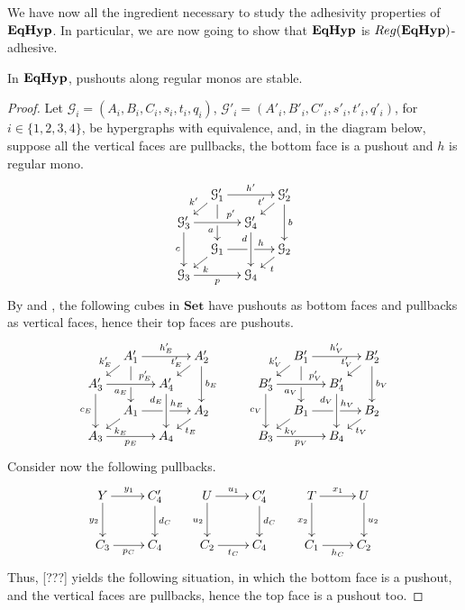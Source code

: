 \documentclass[a4paper,UKenglish,cleveref,pdftex,thm-restate,numberwithinsect]{lipics-v2021}
\newcommand{\Set}{\mathbf{Set}}
\def\B{\textbf {\textup{B}}}
\def\A{\textbf {\textup{A}}}
\newcommand{\catname}[1]{\textbf{\textup{#1}}}
\newcommand{\EqHyp}{\catname{EqHyp}} %
\newcommand{\reg}{\mathsf{Reg}}
\begin{document}
We have now all the ingredient necessary to study the adhesivity properties of $\EqHyp$. In particular, we are now going to show that $\EqHyp$ is $\reg(\EqHyp)$-adhesive.

\begin{lemma}\label{lemma:stab}
	In $\EqHyp$, pushouts along regular monos are stable.
\end{lemma}

\begin{proof}
	Let $\mathcal{G}_i = (A_i, B_i, C_i, s_i, t_i, q_i)$, $\mathcal{G}'_i=(A'_i, B'_i, C'_i, s'_i, t'_i, q'_i)$, for $i \in \{1, 2, 3, 4\}$, be hypergraphs with equivalence, 
	and, in the diagram below, suppose all the vertical faces are pullbacks, the bottom face is a pushout and $h$ is regular mono.
	\[
	\xymatrix@C=10pt@R=6pt{&\mathcal{G}_1'\ar[dd]|\hole_(.65){a}\ar[rr]^{h'} \ar[dl]_{k'} && \mathcal{G}_2' \ar[dd]^{b} \ar[dl]_{t'} \\ \mathcal{G}_3'  \ar[dd]_{c}\ar[rr]^(.7){p'} & & \mathcal{G}_4' \ar[dd]_(.3){d}\\&\mathcal{G}_1\ar[rr]|\hole^(.65){h} \ar[dl]^{k} && \mathcal{G}_2 \ar[dl]^{t} \\\mathcal{G}_3 \ar[rr]_{p} & & \mathcal{G}_4 }
	\]
	By  and , the following cubes in $\Set$ have pushouts as bottom faces and pullbacks as vertical faces, hence their top faces are pushouts.
	\[
	\xymatrix@C=10pt@R=6pt{&A_1'\ar[dd]|\hole_(.65){a_E}\ar[rr]^{h_E'} \ar[dl]_{k_E'} && A_2' \ar[dd]^{b_E} \ar[dl]_{t_E'} \\ A_3'  \ar[dd]_{c_E}\ar[rr]^(.7){p_E'} & & A_4' \ar[dd]_(.3){d_E}\\&A_1\ar[rr]|\hole^(.65){h_E} \ar[dl]^{k_E} && A_2 \ar[dl]^{t_E} \\A_3 \ar[rr]_{p_E} & & A_4 }
	\qquad
	\xymatrix@C=10pt@R=6pt{&B_1'\ar[dd]|\hole_(.65){a_V}\ar[rr]^{h_V'} \ar[dl]_{k_V'} && B_2' \ar[dd]^{b_V} \ar[dl]_{t_V'} \\ B_3'  \ar[dd]_{c_V}\ar[rr]^(.7){p_V'} & & B_4' \ar[dd]_(.3){d_V}\\&B_1\ar[rr]|\hole^(.65){h_V} \ar[dl]^{k_V} && B_2 \ar[dl]^{t_V} \\B_3 \ar[rr]_{p_V} & & B_4 }
	\]
	Consider now the following pullbacks.
	\[\xymatrix{
		Y \ar[d]_{y_2}\ar[r]^{y_1}&{C_4'}\ar[d]^{d_C}&U\ar[d]_{u_2}\ar[r]^{u_1}&{C_4'}\ar[d]^{d_C}&T\ar[r]^{x_1}\ar[d]_{x_2}&U\ar[d]^{u_2}\\
		C_3\ar[r]_{p_C}&C_4&C_2\ar[r]_{t_C}&C_4&C_1\ar[r]_{h_C}&C_2
	}\]
	Thus, [???] yields the following situation, in which the bottom face is a pushout, and the vertical faces are pullbacks, hence the top face is a pushout too.

\end{proof}
\end{document}
